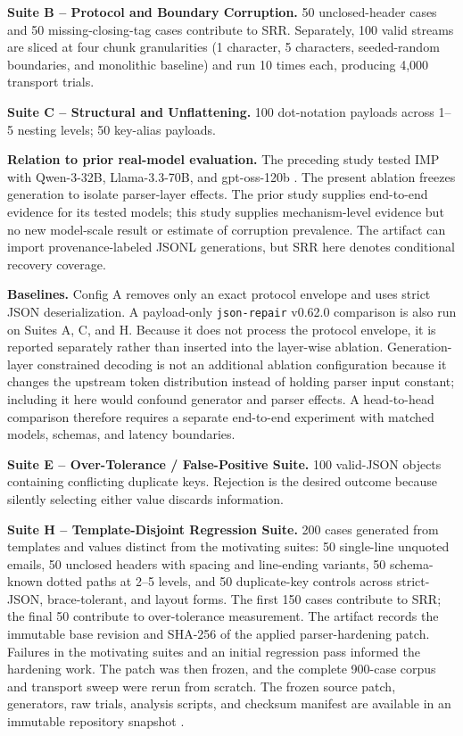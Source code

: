 \documentclass[conference]{IEEEtran}
\begin{document}
\textbf{Suite B -- Protocol and Boundary Corruption.} 50 unclosed-header
cases and 50 missing-closing-tag cases contribute to SRR. Separately, 100
valid streams are sliced at four chunk granularities (1 character, 5
characters, seeded-random boundaries, and monolithic baseline) and run 10
times each, producing 4,000 transport trials.

\textbf{Suite C -- Structural and Unflattening.} 100 dot-notation payloads
across 1--5 nesting levels; 50 key-alias payloads.

\textbf{Relation to prior real-model evaluation.} The preceding study tested
IMP with Qwen-3-32B, Llama-3.3-70B, and gpt-oss-120b \cite{irai2026}. The
present ablation freezes generation to isolate parser-layer effects. The prior
study supplies end-to-end evidence for its tested models; this study supplies
mechanism-level evidence but no new model-scale result or estimate of corruption
prevalence. The artifact can import provenance-labeled JSONL generations, but
SRR here denotes conditional recovery coverage.

\textbf{Baselines.} Config A removes only an exact protocol envelope and
uses strict JSON deserialization. A payload-only \texttt{json-repair}
v0.62.0 comparison is also run on Suites A, C, and H. Because it does not
process the protocol envelope, it is reported separately rather than
inserted into the layer-wise ablation.
Generation-layer constrained decoding is not an additional ablation
configuration because it changes the upstream token distribution instead of
holding parser input constant; including it here would confound generator and
parser effects. A head-to-head comparison therefore requires a separate
end-to-end experiment with matched models, schemas, and latency boundaries.

\textbf{Suite E -- Over-Tolerance / False-Positive Suite.} 100 valid-JSON
objects containing conflicting duplicate keys. Rejection is the desired
outcome because silently selecting either value discards information.

\textbf{Suite H -- Template-Disjoint Regression Suite.} 200 cases generated from
templates and values distinct from the motivating suites: 50 single-line
unquoted emails, 50 unclosed headers with spacing and line-ending variants,
50 schema-known dotted paths at 2--5 levels, and 50 duplicate-key controls
across strict-JSON, brace-tolerant, and layout forms. The first 150 cases
contribute to SRR; the final 50 contribute to over-tolerance measurement.
The artifact records the immutable base revision and SHA-256 of the applied
parser-hardening patch.
Failures in the motivating suites and an initial regression pass informed the
hardening work. The patch was then frozen, and the complete 900-case corpus and
transport sweep were rerun from scratch.
The frozen source patch, generators, raw trials, analysis scripts, and checksum
manifest are available in an immutable repository snapshot \cite{artifact}.
\end{document}
